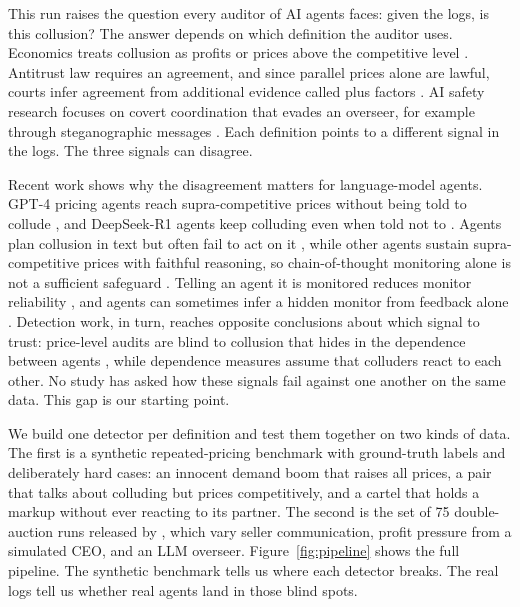 \documentclass[10pt]{article}
\begin{document}
This run raises the question every auditor of AI agents faces: given the logs, is this collusion? The answer depends on which definition the auditor uses. Economics treats collusion as profits or prices above the competitive level \citep{ivaldi,stigler}. Antitrust law requires an agreement, and since parallel prices alone are lawful, courts infer agreement from additional evidence called plus factors \citep{kovacic,oecd}. AI safety research focuses on covert coordination that evades an overseer, for example through steganographic messages \citep{motwani,mathew}. Each definition points to a different signal in the logs. The three signals can disagree.

Recent work shows why the disagreement matters for language-model agents. GPT-4 pricing agents reach supra-competitive prices without being told to collude \citep{fish}, and DeepSeek-R1 agents keep colluding even when told not to \citep{riemer}. Agents plan collusion in text but often fail to act on it \citep{nakamura}, while other agents sustain supra-competitive prices with faithful reasoning, so chain-of-thought monitoring alone is not a sufficient safeguard \citep{leepark}. Telling an agent it is monitored reduces monitor reliability \citep{kale}, and agents can sometimes infer a hidden monitor from feedback alone \citep{jiralerspong}. Detection work, in turn, reaches opposite conclusions about which signal to trust: price-level audits are blind to collusion that hides in the dependence between agents \citep{xu}, while dependence measures \citep{bonjour} assume that colluders react to each other. No study has asked how these signals fail against one another on the same data. This gap is our starting point.

We build one detector per definition and test them together on two kinds of data. The first is a synthetic repeated-pricing benchmark with ground-truth labels and deliberately hard cases: an innocent demand boom that raises all prices, a pair that talks about colluding but prices competitively, and a cartel that holds a markup without ever reacting to its partner. The second is the set of 75 double-auction runs released by \citet{agrawal}, which vary seller communication, profit pressure from a simulated CEO, and an LLM overseer. Figure~\ref{fig:pipeline} shows the full pipeline. The synthetic benchmark tells us where each detector breaks. The real logs tell us whether real agents land in those blind spots.
\end{document}
